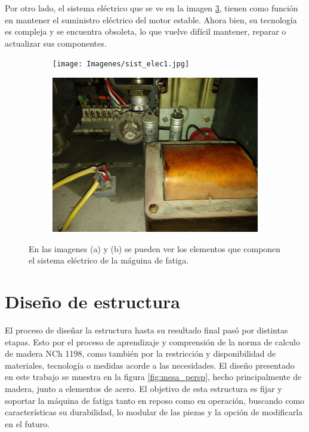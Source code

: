 Por otro lado, el sistema eléctrico que se ve en la imagen \ref{fig:sist_elec}, tienen como función en mantener el suministro eléctrico del motor estable. Ahora bien, su tecnología es compleja y se encuentra obsoleta, lo que vuelve difícil mantener, reparar o actualizar sus componentes.

\begin{figure}[h]
\centering
	\begin{subfigure}{0.5\linewidth}
		\centering
		\texttt{[image: Imagenes/sist\_elec1.jpg]}
		\caption{}\label{fig:sist_elect1}
	\end{subfigure}%
	\begin{subfigure}{0.5\linewidth}
		\centering
		\includegraphics[width=0.98\linewidth]{Imagenes/sist_elec2.jpg}
		\caption{}\label{fig:sist_elect2}
	\end{subfigure}%
\caption{En las imagenes (a) y (b) se pueden ver los elementos que componen el sistema eléctrico de la máguina de fatiga.}
\label{fig:sist_elec}
\end{figure}
 
\section{Diseño de estructura}
El proceso de diseñar la estructura hasta su resultado final pasó por distintas etapas. Esto por el proceso de aprendizaje y comprensión de la norma de calculo de madera NCh 1198, como también por la restricción y disponibilidad de materiales, tecnología o medidas acorde a las necesidades. El diseño presentado en este trabajo se muestra en la figura \ref{fig:mesa_persp}, hecho principalmente de madera, junto a elementos de acero. El objetivo de esta estructura es fijar y soportar la máquina de fatiga tanto en reposo como en operación, buscando como características su durabilidad, lo modular de las piezas y la opción de modificarla en el futuro.

